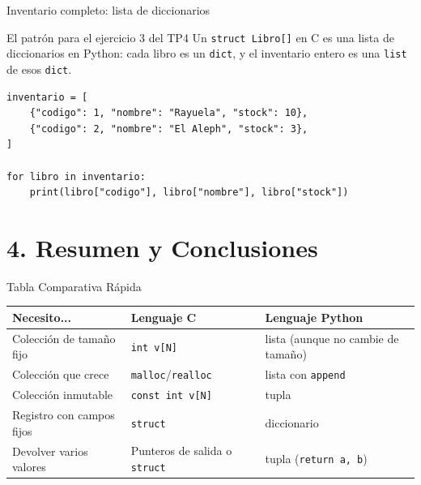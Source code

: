 \documentclass{beamer}
\begin{document}
\begin{frame}[fragile]{Inventario completo: lista de diccionarios}
  \begin{block}{El patrón para el ejercicio 3 del TP4}
    Un \texttt{struct Libro[]} en C es una lista de diccionarios en
    Python: cada libro es un \texttt{dict}, y el inventario entero es una
    \texttt{list} de esos \texttt{dict}.
  \end{block}
  \begin{verbatim}
inventario = [
    {"codigo": 1, "nombre": "Rayuela", "stock": 10},
    {"codigo": 2, "nombre": "El Aleph", "stock": 3},
]

for libro in inventario:
    print(libro["codigo"], libro["nombre"], libro["stock"])
  \end{verbatim}
\end{frame}

\section{4. Resumen y Conclusiones}

\begin{frame}{Tabla Comparativa Rápida}
  \small
  \begin{tabular}{|p{2.6cm}|p{3.4cm}|p{3.4cm}|}
    \hline
    \textbf{Necesito...} & \textbf{Lenguaje C} & \textbf{Lenguaje Python} \\
    \hline \hline
    Colección de tamaño fijo & \texttt{int v[N]} & lista (aunque no cambie de tamaño) \\
    \hline
    Colección que crece & \texttt{malloc}/\texttt{realloc} & lista con \texttt{append} \\
    \hline
    Colección inmutable & \texttt{const int v[N]} & tupla \\
    \hline
    Registro con campos fijos & \texttt{struct} & diccionario \\
    \hline
    Devolver varios valores & Punteros de salida o \texttt{struct} & tupla (\texttt{return a, b}) \\
    \hline
  \end{tabular}
\end{frame}
\end{document}
